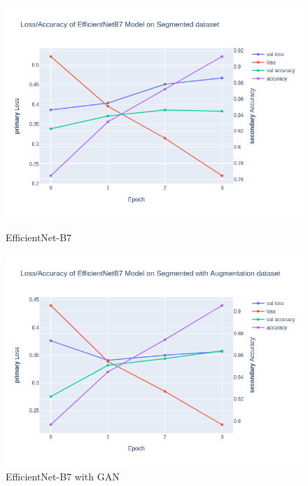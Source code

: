 \documentclass[12pt]{diazessay}
\begin{document}
    \begin{figure}[H]
        \centering
        \begin{minipage}[b]{0.45\textwidth}
            \centering
            \includegraphics[width=\textwidth]{charts/EfficientNetB7_classification.png}
            \caption{\small{EfficientNet-B7}}
        \end{minipage}
        \hfill
        \begin{minipage}[b]{0.45\textwidth}
            \centering
            \includegraphics[width=\textwidth]{charts/EfficientNetB7_classificationWithGAN.png}
            \caption{ \small{ EfficientNet-B7 with GAN}}
        \end{minipage}
    \end{figure}
\end{document}
